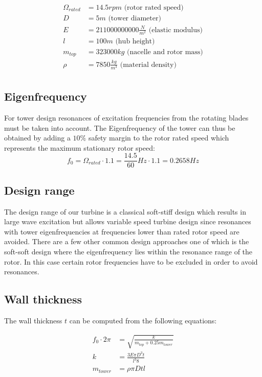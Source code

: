 \documentclass[10pt]{article}
\begin{document}
\begin{align*}
	\Omega_{rated} &= 14.5 rpm \text{ (rotor rated speed)} \\
	D &= 5m \text{ (tower diameter)} \\
	E &=211000000000 \frac{N}{m^2} \text{ (elastic modulus)} \\
	l &=100m \text{ (hub height)} \\
	m_{top} &=323000 kg\text{ (nacelle and rotor mass)} \\
	\rho &=7850 \frac{kg}{m^3}\text{ (material density)} \\
\end{align*}

\subsection{Eigenfrequency}
For tower design resonances of excitation frequencies from the rotating blades must be taken into account. The Eigenfrequency of the tower can thus be obtained by adding a $10 \%$ safety margin to the rotor rated speed which represents the maximum stationary rotor speed:
\begin{equation*}
	f_0 = \Omega_{rated} \cdot 1.1 = \frac{14.5}{60} Hz \cdot 1.1 = 0.2658 Hz
\end{equation*}

\subsection{Design range}
The design range of our turbine is a classical soft-stiff design which results in large wave excitation but allows variable speed turbine design since resonances with tower eigenfrequencies at frequencies lower than rated rotor speed are avoided. There are a few other common design approaches one of which is the soft-soft design where the eigenfrequency lies within the resonance range of the rotor. In this case certain rotor frequencies have to be excluded in order to avoid resonances.

\subsection{Wall thickness}
The wall thickness $t$ can be computed from the following equations:

\begin{align}
f_0 \cdot 2 \pi &= \sqrt{\frac{k}{m_{top} + 0.25 m_{tower}}} \\
k &= \frac{3 E \pi D^3 t}{l^3 8} \\
m_{tower} &= \rho \pi D t l
\end{align}
\end{document}
